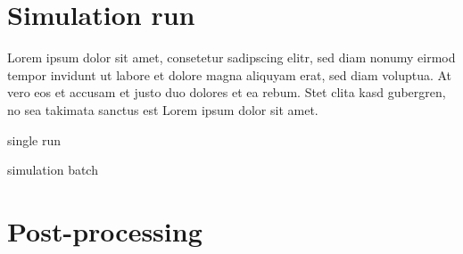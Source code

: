 \section{Simulation run} \label{sec:simulation_run}
Lorem ipsum dolor sit amet, consetetur sadipscing elitr, sed diam nonumy eirmod tempor invidunt ut labore et dolore magna aliquyam erat, sed diam voluptua. At vero eos et accusam et justo duo dolores et ea rebum. Stet clita kasd gubergren, no sea takimata sanctus est Lorem ipsum dolor sit amet.
\begin{description}
  \item single run
  \item simulation batch
\end{description}




\section{Post-processing} \label{sec:post_processing}
